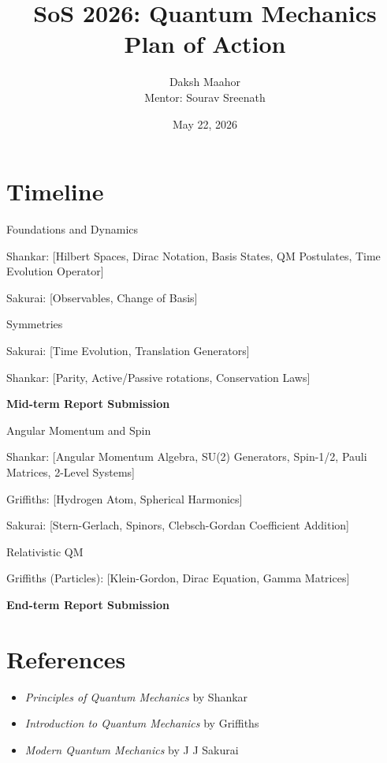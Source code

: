 \documentclass[11pt]{article}
\title{\textbf{SoS 2026: Quantum Mechanics}\\[0.3em]
\textbf{Plan of Action}}
\author{Daksh Maahor\\
Mentor: Sourav Sreenath}
\date{May 22, 2026}
\begin{document}
\maketitle

\section*{Timeline}

\begin{description}[leftmargin=2.8cm,style=nextline]

\item[Week 1-2]
Foundations and Dynamics

Shankar: [Hilbert Spaces, Dirac Notation, Basis States, QM Postulates, Time Evolution Operator]

Sakurai: [Observables, Change of Basis]

\item[Weeks 3-4]
Symmetries

Sakurai: [Time Evolution, Translation Generators]

Shankar: [Parity, Active/Passive rotations, Conservation Laws]

\item[]
\textbf{Mid-term Report Submission}

\item[Weeks 5-6]
Angular Momentum and Spin

Shankar: [Angular Momentum Algebra, SU(2) Generators, Spin-1/2, Pauli Matrices, 2-Level Systems]

Griffiths: [Hydrogen Atom, Spherical Harmonics]

Sakurai: [Stern-Gerlach, Spinors, Clebsch-Gordan Coefficient Addition]

\item[Weeks 7-8]
Relativistic QM

Griffiths (Particles): [Klein-Gordon, Dirac Equation, Gamma Matrices]

\item[]
\textbf{End-term Report Submission}

\end{description}

\section*{References}

\begin{itemize}
    \item \textit{Principles of Quantum Mechanics} by Shankar
    \item \textit{Introduction to Quantum Mechanics} by Griffiths
    \item \textit{Modern Quantum Mechanics} by J J Sakurai
\end{itemize}
\end{document}
